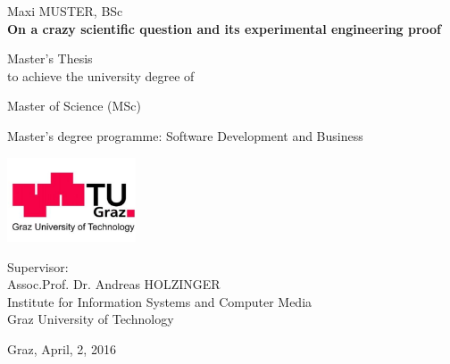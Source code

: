 
\begin{center}

{\large Maxi MUSTER, BSc} \\
\vspace{1cm}
{\LARGE \textbf
{
On a crazy scientific question and its experimental engineering proof\\
}
}
\vspace{3cm}

{\larger
Master's Thesis \\[1ex]
to achieve the university degree of

Master of Science (MSc)

Master's degree programme: Software Development and Business

}



\end{center}

\vspace{2cm}

\begin{center}
\includegraphics[height=2.5cm]{images/tuglogo}

\vspace{2cm} %

{
Supervisor:\\
Assoc.Prof. Dr. Andreas HOLZINGER\\

Institute for Information Systems and Computer Media\\
Graz University of Technology


}
\vspace{1cm}

{
Graz, April, 2, 2016 \\
}

\end{center}





